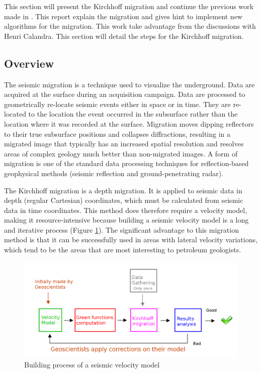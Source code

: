 This section will present the Kirchhoff migration and continue the previous work made in \cite{rapport_Total_Petiton}.
This report explain the migration and gives hint to implement new algorithms for the migration.
This work take advantage from the discussions with Henri Calandra.
This section will detail the steps for the Kirchhoff migration.

\subsection{Overview}
The seismic migration is a technique used to visualize the underground.
Data are acquired at the surface during an acquisition campaign.
Data are processed to geometrically re-locate seismic events either in space or in time.
They are re-located to the location the event occurred in the subsurface rather than the location where it was recorded at the surface.
Migration moves dipping reflectors to their true subsurface positions and collapses diffractions, resulting in a migrated image that typically has an increased spatial resolution and resolves areas of complex geology much better than non-migrated images.
A form of migration is one of the standard data processing techniques for reflection-based geophysical methods (seismic reflection and ground-penetrating radar).

The Kirchhoff migration \cite{PingY1995} \cite{PTSCS2009} is a depth migration.
It is applied to seismic data in depth (regular Cartesian) coordinates, which must be calculated from seismic data in time coordinates.
This method does therefore require a velocity model, making it resource-intensive because building a seismic velocity model is a long and iterative process (Figure \ref{fig:kirchhoff-process}).
The significant advantage to this migration method is that it can be successfully used in areas with lateral velocity variations, which tend to be the areas that are most interesting to petroleum geologists.

\begin{figure}[H]
	\centering
	\includegraphics[scale=0.25]{kirchhoff-process}
	\caption{Building process of a seismic velocity model \label{fig:kirchhoff-process}}
\end{figure}

